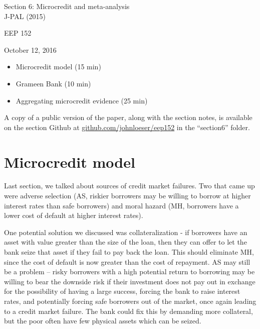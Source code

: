 \documentclass[12pt,english]{article}
\begin{document}
\begin{center}
{\Large{}Section 6: Microcredit and meta-analysis} \\
{\large{J-PAL (2015)}}
\par\end{center}{\Large \par}

\begin{center}
EEP 152
\par\end{center}

\begin{center}
October 12, 2016
\par\end{center}

\begin{itemize}
	\setlength\itemsep{-0.5em}
	\item Microcredit model (15 min)
	\item Grameen Bank (10 min)
	\item Aggregating microcredit evidence (25 min)
\end{itemize}
A copy of a public version of the paper, along with the section notes, is available on the section Github at \href{github.com/johnloeser/eep152}{github.com/johnloeser/eep152} in the ``section6'' folder.

\section{Microcredit model}

Last section, we talked about sources of credit market failures. Two that came up were adverse selection (AS, riskier borrowers may be willing to borrow at higher interest rates than safe borrowers) and moral hazard (MH, borrowers have a lower cost of default at higher interest rates).

One potential solution we discussed was collateralization - if borrowers have an asset with value greater than the size of the loan, then they can offer to let the bank seize that asset if they fail to pay back the loan. This should eliminate MH, since the cost of default is now greater than the cost of repayment. AS may still be a problem -- risky borrowers with a high potential return to borrowing may be willing to bear the downside risk if their investment does not pay out in exchange for the possibility of having a large success, forcing the bank to raise interest rates, and potentially forcing safe borrowers out of the market, once again leading to a credit market failure. The bank could fix this by demanding more collateral, but the poor often have few physical assets which can be seized.
\end{document}
